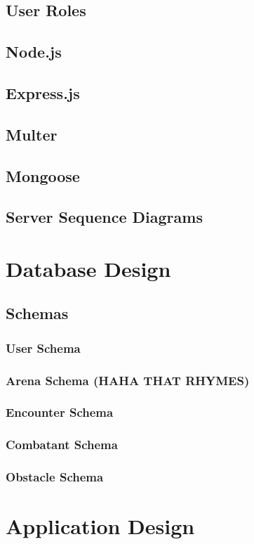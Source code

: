 \documentclass[12pt,a4paper]{report}
\begin{document}
		\subsection{User Roles}
		\subsection{Node.js}
		\subsection{Express.js}
		\subsection{Multer}
		\subsection{Mongoose}
		\subsection{Server Sequence Diagrams}
	
	\section{Database Design}
		\subsection{Schemas}
			\subsubsection{User Schema}
			\subsubsection{Arena Schema (HAHA THAT RHYMES)}
			\subsubsection{Encounter Schema}
			\subsubsection{Combatant Schema}
			\subsubsection{Obstacle Schema}
	
	\section{Application Design}
\end{document}
